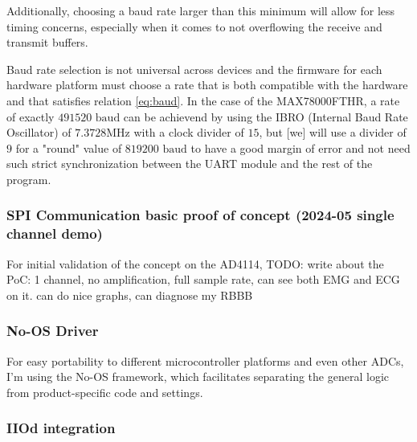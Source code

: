 \documentclass{thesis}
\newcommand{\todo}[1]{{\color{red}TODO: #1}}
\begin{document}
Additionally, choosing a baud rate larger than this minimum will allow for less timing concerns, especially when it comes to not overflowing the receive and transmit buffers.

Baud rate selection is not universal across devices and the firmware for each hardware platform must choose a rate that is both compatible with the hardware and that satisfies relation \ref{eq:baud}. In the case of the MAX78000FTHR, a rate of exactly $491520\text{ baud}$ can be achievend by using the IBRO (Internal Baud Rate Oscillator) of $7.3728\text{MHz}$ with a clock divider of $15$, but [we] will use a divider of $9$ for a "round" value of $819200\text{ baud}$ to have a good margin of error and not need such strict synchronization between the UART module and the rest of the program.

\subsubsection{SPI Communication basic proof of concept (2024-05 single channel demo)}

For initial validation of the concept on the AD4114, \todo{write about the PoC: 1 channel, no amplification, full sample rate, can see both EMG and ECG on it. can do nice graphs, can diagnose my RBBB}

\subsubsection{No-OS Driver}

For easy portability to different microcontroller platforms and even other ADCs, I'm using the No-OS framework, which facilitates separating the general logic from product-specific code and settings.

\subsubsection{IIOd integration}
\end{document}
